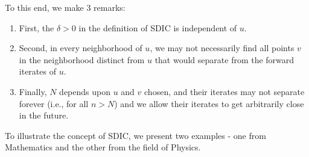 \documentclass[a4paper,12pt,twoside]{report}
\begin{document}
To this end, we make 3 remarks:
\vspace{-5mm}
\begin{enumerate}
  \item First, the $\delta>0$ in the definition of SDIC is independent of $u$. 
  \item Second, in every neighborhood of $u$, we may not necessarily find all points $v$ in the neighborhood distinct from $u$ that would separate from the forward iterates of $u$. 
  \item  Finally, $N$ depends upon $u$ and $v$ chosen, and their iterates may not separate forever (i.e., for all $n>N$) and we allow their iterates to get arbitrarily close in the future. 
\end{enumerate}

To illustrate the concept of SDIC, we present two examples - one from Mathematics and the other from the field of Physics.
\end{document}
